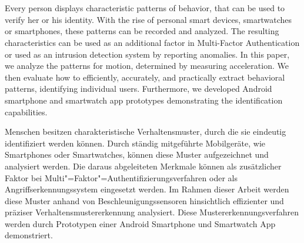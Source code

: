 \chapter{\abstractname}
Every person displays characteristic patterns of behavior, that can be used to verify her or his identity. With the rise of personal smart devices, \eg smartwatches or smartphones, these patterns can be recorded and analyzed. The resulting characteristics can be used as an additional factor in Multi-Factor Authentication or used as an intrusion detection system by reporting anomalies.
In this paper, we analyze the patterns for motion, determined by measuring acceleration. We then evaluate how to efficiently, accurately, and practically extract behavioral patterns, identifying individual users. Furthermore, we developed Android smartphone and smartwatch app prototypes demonstrating the identification capabilities.

\vspace{3cm}
\noindent
Menschen besitzen charakteristische Verhaltensmuster, durch die sie eindeutig identifiziert werden können. Durch ständig mitgeführte Mobilgeräte, wie Smartphones oder Smartwatches, können diese Muster aufgezeichnet und analysiert werden. Die daraus abgeleiteten Merkmale können als zusätzlicher Faktor bei Multi"=Faktor"=Authentifizierungsverfahren oder als Angriffserkennungssystem eingesetzt werden.
Im Rahmen dieser Arbeit werden diese Muster anhand von Beschleunigungssensoren hinsichtlich effizienter und präziser Verhaltensmustererkennung analysiert. Diese Mustererkennungsverfahren werden durch Prototypen einer Android Smartphone und Smartwatch App demonstriert.
